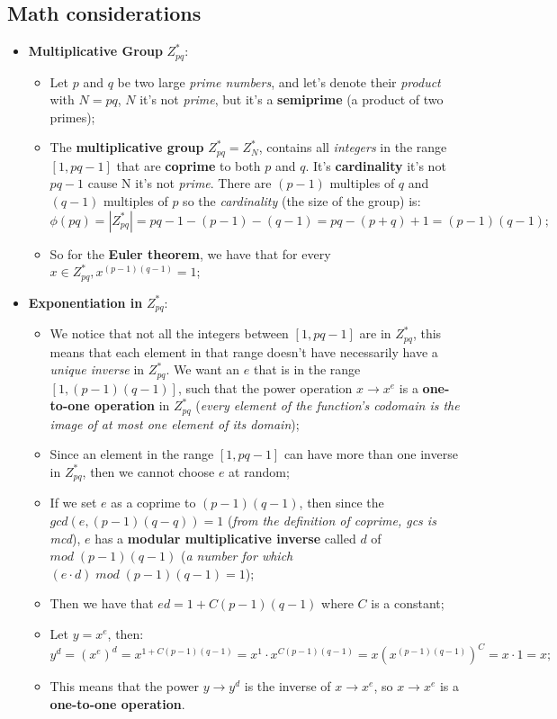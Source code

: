 \documentclass{article}
\begin{document}
\subsection{Math considerations}
\begin{itemize}
\item \textbf{Multiplicative Group} $Z_{pq}^{*}$:
\begin{itemize}
\item Let $p$ and $q$ be two large \emph{prime numbers}, and let's denote their \emph{product} with $N=pq$, $N$ it's not \emph{prime}, but it's a \textbf{semiprime} (a product of two primes);
\item The \textbf{multiplicative group} $Z_{pq}^{*}= Z_N^{*}$, contains all \emph{integers} in the range $\left[1,pq-1\right]$ that are \textbf{coprime} to both $p$ and $q$. It's \textbf{cardinality} it's not $pq-1$ cause N it's not \emph{prime}. There are $(p-1)$ multiples of $q$ and $(q-1)$ multiples of $p$ so the \emph{cardinality} (the size of the group) is:
\[ \phi(pq) = |Z_{pq}^{*}| = pq-1 - (p-1) - (q-1) = pq - (p+q) +1 = (p-1)(q-1); \]
\item So for the \textbf{Euler theorem}, we have that for every $x \in Z_{pq}^{*}, x^{(p-1)(q-1)} = 1$;
\end{itemize}
\item \textbf{Exponentiation in} $Z_{pq}^{*}$:
\begin{itemize}
\item We notice that not all the integers between $\left[1,pq-1\right]$ are in $Z_{pq}^{*}$, this means that each element in that range doesn't have necessarily have a \emph{unique inverse} in $Z_{pq}^{*}$. We want an $e$ that is in the range $\left [1, (p-1)(q-1) \right ]$, such that the power operation $x \rightarrow x^e$ is a \textbf{one-to-one operation} in $Z_{pq}^{*}$ (\emph{every element of the \emph{function's codomain} is the image of at most one element of its \emph{domain}});
\item Since an element in the range $\left[1,pq-1\right]$ can have more than one inverse in $Z_{pq}^{*}$, then we cannot choose $e$ at random;
\item If we set $e$ as a coprime to $(p-1)(q-1)$, then since the $gcd(e, (p-1)(q-q)) = 1$ (\emph{from the definition of coprime, gcs is mcd}), $e$ has a \textbf{modular multiplicative inverse} called $d$ of $mod\; (p-1)(q-1)$ (\emph{a number for which} $(e \cdot d)\; mod\; (p-1)(q-1) = 1$);
\item Then we have that $ed= 1 + C(p-1)(q-1)$ where $C$ is a constant;
\item Let $y=x^e$, then:
\[y^d = (x^e)^d = x^{1+C(p-1)(q-1)} = x^1\cdot x^{C(p-1)(q-1)} = x(x^{(p-1)(q-1)})^C = x \cdot 1 = x;\]
\item This means that the power $y \rightarrow y^d$ is the inverse of $x \rightarrow x^e$, so $x \rightarrow x^e$ is a\textbf{ one-to-one operation}.
\end{itemize}
\end{itemize}
\end{document}
